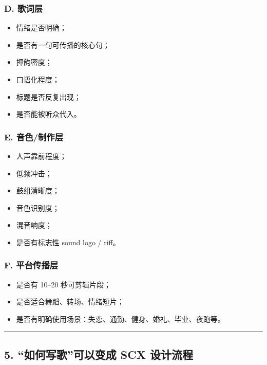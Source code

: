 \documentclass[
  12pt,
]{ctexart}
\providecommand{\tightlist}{%
  \setlength{\itemsep}{0pt}\setlength{\parskip}{0pt}}
\begin{document}
\subsubsection{D. 歌词层}\label{d.-ux6b4cux8bcdux5c42}

\begin{itemize}
\tightlist
\item
  情绪是否明确；
\item
  是否有一句可传播的核心句；
\item
  押韵密度；
\item
  口语化程度；
\item
  标题是否反复出现；
\item
  是否能被听众代入。
\end{itemize}

\subsubsection{E. 音色/制作层}\label{e.-ux97f3ux8272ux5236ux4f5cux5c42}

\begin{itemize}
\tightlist
\item
  人声靠前程度；
\item
  低频冲击；
\item
  鼓组清晰度；
\item
  音色识别度；
\item
  混音响度；
\item
  是否有标志性 sound logo / riff。
\end{itemize}

\subsubsection{F. 平台传播层}\label{f.-ux5e73ux53f0ux4f20ux64adux5c42}

\begin{itemize}
\tightlist
\item
  是否有 10--20 秒可剪辑片段；
\item
  是否适合舞蹈、转场、情绪短片；
\item
  是否有明确使用场景：失恋、通勤、健身、婚礼、毕业、夜跑等。
\end{itemize}

\begin{center}\rule{0.5\linewidth}{0.5pt}\end{center}

\subsection{5. ``如何写歌''可以变成 SCX
设计流程}\label{ux5982ux4f55ux5199ux6b4cux53efux4ee5ux53d8ux6210-scx-ux8bbeux8ba1ux6d41ux7a0b}
\end{document}
